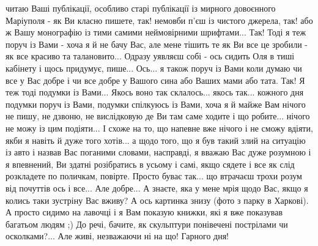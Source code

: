 читаю Ваші публікації, особливо старі публікації із мирного довоєнного
Маріуполя - як Ви класно пишете, так! немовби п'єш із чистого джерела, так! або
ж Вашу монографію із тими самими неймовірними шрифтами...  Так! Тоді я теж
поруч із Вами - хоча я й не бачу Вас, але мене тішить те як Ви все це зробили -
як все красиво та талановито...  Одразу уявляєш собі - ось сидить Оля в тиші
кабінету і щось придумує, пише... Ось... я також поруч із Вами коли думаю чи
все у Вас добре і чи все добре у Вашого сина або Ваших мами або тата. Так! Я
теж тоді подумки із Вами...  Якось воно так склалось... якось так... кожного
дня подумки поруч із Вами, подумки спілкуюсь із Вами, хоча я й майже Вам нічого
не пишу, не дзвоню, не вислідковую де Ви там саме ходите і що робите...  нічого
не можу із цим подіяти... І схоже на то, що напевне вже нічого і не сможу
вдіяти, якби я навіть й дуже того хотів... а щодо того, що я був такий злий
на ситуацію із авто і назвав Вас поганими словами, насправді, я вважаю Вас дуже
розумною і я впевнений, Ви здатні розібратись в усьому і самі, якщо сядете і
все як слід розкладете по поличкам, повірте. Просто буває так... що втрачаєш
трохи розум від почуттів ось і все...  Але добре... А знаєте, яка у мене мрія
щодо Вас, якщо я колись таки зустріну Вас вживу?  А ось картинка знизу (фото з
парку в Харкові). А просто сидимо на лавочці і я Вам показую книжки, які я вже
показував багатьом людям ;) До речі, бачите, як скульптури понівечені
пострілами чи осколками?... Але живі, незважаючи ні на що! Гарного дня!

